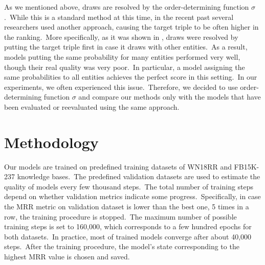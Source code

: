 \documentclass[longabstract, english, mgr]{iithesis}
\theoremstyle{default_theorem_style}\newtheorem{theorem}{Theorem}
\theoremstyle{default_theorem_style}\newtheorem{definition}{Definition}
\begin{document}
\noindent As we mentioned above, draws are resolved by the order-determining function $\sigma$.\ While this is a
standard method at this time, in the recent past several researchers used another approach, causing the target triple
to be often higher in the ranking.\ More specifically, as it was shown in \cite{re_evaluation}, draws were resolved
by putting the target triple first in case it draws with other entities.\ As a result, models putting the same
probability for many entities performed very well, though their real quality was very poor.\ In particular, a model
assigning the same probabilities to all entities achieves the perfect score in this setting.\ In our experiments, we often
experienced this issue.\ Therefore, we decided to use order-determining function $\sigma$ and compare our methods only
with the models that have been evaluated or reevaluated using the same approach.

\section{Methodology}

Our models are trained on predefined training datasets of WN18RR and FB15K-237 knowledge bases.\ The predefined
validation datasets are used to estimate the quality of models every few thousand steps.\ The total number of training
steps depend on whether validation metrics indicate some progress.\ Specifically, in case the MRR metric on validation
dataset is lower than the best one, 5 times in a row, the training procedure is stopped.\ The maximum
number of possible training steps is set to 160,000, which corresponds to a few hundred epochs for both datasets.\ In
practice, most of trained models converge after about 40,000 steps.\ After the training procedure, the model's state
corresponding to the highest MRR value is chosen and saved.\newline
\end{document}
